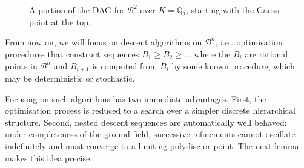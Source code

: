\documentclass[10pt]{article}
\theoremstyle{definition}
\newcommand{\QQ}{\mathbb{Q}}
\begin{document}
\begin{figure}[t]
{%
  }
  \caption{A portion of the DAG for $\mathcal{B}^2$ over $K = \QQ_2$, starting with the Gauss point at the top.}
  \label{fig:nestedPolydiscs3D}
\end{figure}

From now on, we will focus on descent algorithms on $\mathcal{B}^n$, i.e., optimisation procedures that construct sequences $B_1 \ge  B_2 \ge \dotsc$ where the $B_i$ are rational points in $\mathcal{B}^n$ and $B_{i+1}$ is computed from $B_i$ by some known procedure, which may be deterministic or stochastic.

Focusing on such algorithms has two immediate advantages. First, the optimisation process is reduced to a search over a simpler discrete hierarchical structure. Second, nested descent sequences are automatically well behaved: under completeness of the ground field, successive refinements cannot oscillate indefinitely and must converge to a limiting polydisc or point. The next lemma makes this idea precise.
\end{document}

